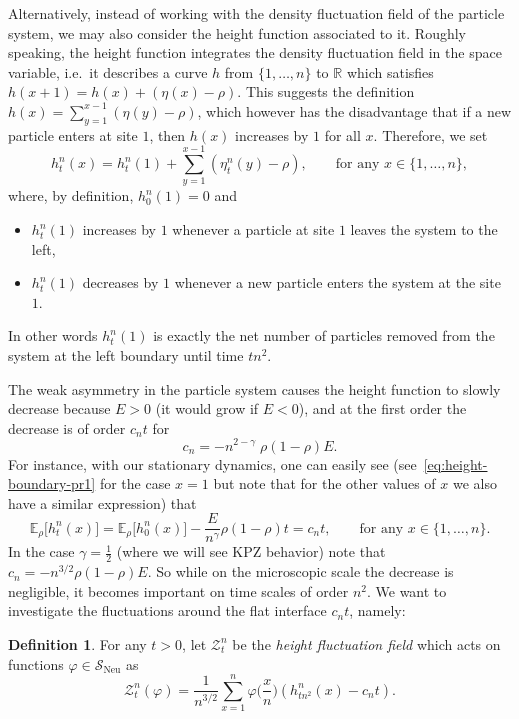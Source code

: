 \documentclass[10pt]{amsart}
\theoremstyle{definition}\newtheorem{defi}[theo]{Definition}\newtheorem{rema}[theo]{Remark}\newtheorem{exam}[theo]{Example}\newtheorem{exem}[theo]{Example}\newtheorem{nota}[theo]{Notation}
\DeclareMathOperator{\Neu}{Neu}
\newcommand{\bb}[1]{{\mathbb #1}}
\newcommand{\RR}{\mathbb R}
\newcommand{\mc}[1]{{\mathcal #1}}
\renewcommand{\mc}[1]{{\mathcal #1}}
\newcommand{\SN}{\ensuremath{\mc S_{\Neu}}}
\renewcommand{\tfrac}{\frac}
\begin{document}
Alternatively, instead of working with the density fluctuation field of the particle system, we may also consider the height function associated to it. Roughly speaking, the height function integrates the density fluctuation field in the space variable, i.e.~it describes a curve $h$ from $\{1, \dots, n\}$ to $\RR$ which satisfies $h(x+1) = h(x) + (\eta(x)-\rho)$. This suggests the definition $h(x) = \sum_{y=1}^{x-1} (\eta(y) - \rho)$, which however has the disadvantage that if a new particle enters at site $1$, then $h(x)$ increases by $1$ for all $x$. Therefore, we set
\begin{equation}\label{eq:htn}
h^n_t (x) = h^n_t (1) + \sum_{y = 1}^{x - 1} (\eta^n_{t} (y) - \rho), \qquad \text{for any }x \in \{ 1, \ldots, n \},
\end{equation}
where, by definition, $h_0^n (1) = 0$ and
\begin{itemize}
\item $h_t^n (1)$ increases by $1$ whenever a particle at site $1$ leaves the system to the left,
\item $h_t^n (1)$ decreases by $1$ whenever a new particle enters the system at the site $1$.
\end{itemize}
In other words $h_t^n (1)$ is exactly the net number of particles removed from the system at the left boundary until time $tn^2$.

The weak asymmetry in the particle system causes the height function to slowly decrease because $E>0$ (it would grow if $E<0$), and at the first order the decrease is of order $c_n t$ for
\begin{equation}
c_n = -n^{2 - \gamma} \; \rho (1 - \rho) E. \label{eq:cn}
\end{equation}
For instance, with our stationary dynamics, one can easily see (see~\eqref{eq:height-boundary-pr1} for the case $x=1$ but note that for the other values of $x$ we also have a similar expression) that
\[
\bb E_\rho\big[h_t^n(x)\big] = \bb E_\rho\big[h_0^n(x)\big] - \frac{E}{n^\gamma} \rho(1-\rho)t = c_n t, \qquad \text{for any } x\in\{1,\dots,n\}.
\]
In the case $\gamma = \frac12$ (where we will see KPZ behavior) note that $c_n = - n^{3/2} \rho(1-\rho)E$. So while on the microscopic scale the decrease is negligible, it becomes important on time scales of order $n^2$. We want to investigate the fluctuations around the flat interface $c_n t$, namely:

\begin{defi}
For any $t >0$, let $\mc Z_t^n$ be the \emph{height fluctuation field} which acts on functions $\varphi \in \SN$ as
\[
\mc Z^n_t(\varphi) = \frac{1}{n^{3/2}} \sum_{x = 1}^n \varphi\bigg(\tfrac{x}{n}\bigg) (h^n_{tn^2}(x) - c_n t).
\]
\end{defi}
\end{document}

